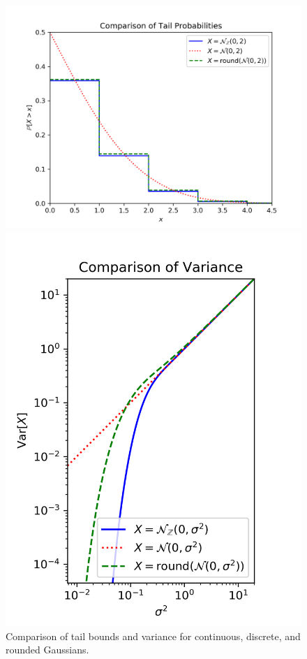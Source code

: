 \documentclass{jpc}
\begin{document}
\begin{figure}[h!]
    \centering
    \begin{minipage}{0.64\textwidth}
        \includegraphics[width=\textwidth]{dg_tail.png}
    \end{minipage}
    \hspace{-10pt}
    \begin{minipage}{0.36\textwidth}
        \includegraphics[width=\textwidth]{dg_var.png}
    \end{minipage}
    \caption{Comparison of tail bounds and variance for continuous, discrete, and rounded Gaussians.}
    \label{fig:plots}
\end{figure}
\end{document}
